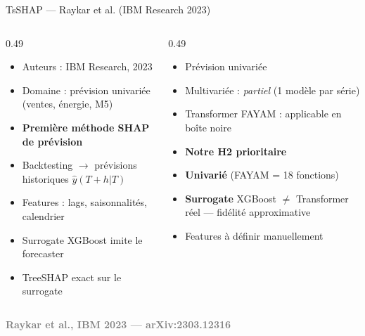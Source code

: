 \documentclass[10pt]{beamer}
\newcommand{\source}[1]{\vspace{4pt}\hfill{\textcolor{gray}{\textbf{\tiny #1}}}}
\begin{document}
\begin{frame}{TsSHAP — Raykar et al. (IBM Research 2023)}
  \begin{columns}
    \begin{column}{0.49\textwidth}
      \begin{ctxbox}
        \begin{itemize}
          \item Auteurs : IBM Research, 2023
          \item Domaine : prévision univariée (ventes, énergie, M5)
          \item \textbf{Première méthode SHAP de prévision}
        \end{itemize}
      \end{ctxbox}
      \begin{probbox}
        \begin{itemize}
          \item Backtesting $\to$ prévisions historiques $\hat{y}(T+h|T)$
          \item Features : lags, saisonnalités, calendrier
          \item Surrogate XGBoost imite le forecaster
          \item TreeSHAP exact sur le surrogate
        \end{itemize}
      \end{probbox}
    \end{column}
    \begin{column}{0.49\textwidth}
      \begin{transposbox}
        \begin{itemize}
          \item Prévision univariée \checkmark
          \item Multivariée : \emph{partiel} (1 modèle par série)
          \item Transformer FAYAM : applicable en boîte noire
          \item \textbf{Notre H2 prioritaire}
        \end{itemize}
      \end{transposbox}
      \begin{limitbox}
        \begin{itemize}
          \item \textbf{Univarié} (FAYAM = 18 fonctions)
          \item \textbf{Surrogate} XGBoost $\neq$ Transformer réel — fidélité approximative
          \item Features à définir manuellement
        \end{itemize}
      \end{limitbox}
    \end{column}
  \end{columns}
  \source{Raykar et al., IBM 2023 --- arXiv:2303.12316}
\end{frame}
\end{document}
